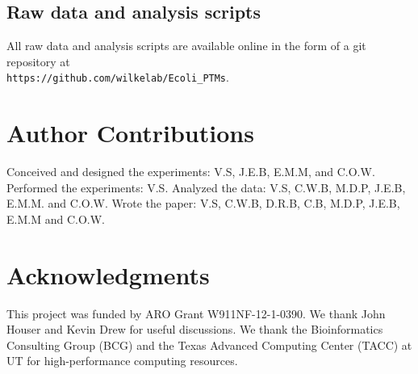 \documentclass[12pt]{article}
\begin{document}




\subsection{Raw data and analysis scripts}

All raw data and analysis scripts are available online in the form of a git repository at\\ \texttt{https://github.com/wilkelab/Ecoli\_PTMs}.


\section{Author Contributions}
Conceived and designed the experiments: V.S, J.E.B, E.M.M, and C.O.W. Performed the experiments: V.S. Analyzed the data: V.S, C.W.B, M.D.P, J.E.B, E.M.M. and C.O.W. Wrote the paper: V.S, C.W.B, D.R.B, C.B, M.D.P, J.E.B, E.M.M and C.O.W.

\section{Acknowledgments}
This project was funded by ARO Grant W911NF-12-1-0390. We thank John Houser and Kevin Drew for useful discussions. We thank the Bioinformatics Consulting Group (BCG) and the Texas Advanced Computing Center (TACC) at UT for high-performance computing resources. 



\end{document}
